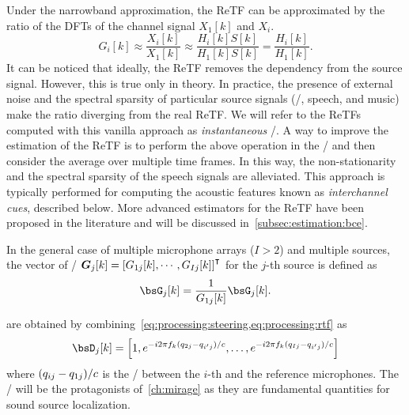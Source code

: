 \mynewline
Under the narrowband approximation, the \ac{ReTF} can be approximated by the ratio of the \acp{DFT} of the channel signal $X_1[k]$ and $X_i$.
\begin{equation}\label{eq:processing:inst_retf}
    G_i[k] \approx \frac{X_i[k]}{X_1[k]} \approx \frac{H_i[k]S[k]}{H_1[k]S[k]} = \frac{H_i[k]}{H_1[k]}
    .
\end{equation}
It can be noticed that ideally, the \ac{ReTF} removes the dependency from the source signal.
However, this is true only in theory.
In practice, the presence of external noise and the spectral sparsity of particular source signals (\eg/, speech, and music) make the ratio diverging from the real \ac{ReTF}.
We will refer to the \acp{ReTF} computed with this vanilla approach as \textit{instantaneous} \ReTF/.
A way to improve the estimation of the \ac{ReTF} is to perform the above operation in the \STFT/ and then consider the average over multiple time frames.
In this way, the non-stationarity and the spectral sparsity of the speech signals are alleviated.
This approach is typically performed for computing the acoustic features known as \textit{interchannel cues}, described below.
More advanced estimators for the \ac{ReTF} have been proposed in the literature and will be discussed in~\cref{subsec:estimation:bce}.


\mynewline
In the general case of multiple microphone arrays ($I>2$) and multiple sources, the vector of \ReTFs/
$\boldsymbol{G}_j[k] = \ktranspose{\klist{{G}_ {1j}[k], \cdots, {G}_{Ij}[k]}}$
for the $j$-th source is defined as
\begin{equation}
    {\bsG}_j[k] = \frac{1}{{G}_{1j}[k]} {\bsG}_j[k]
    .
\end{equation}

 are obtained by combining~\cref{eq:processing:steering,eq:processing:rtf} as
\begin{equation}\label{eq:processing:relativesteering}
    {\bsD}_{j}[k] = \klist{
                         1,
                         \cste^{-\csti 2 \pi f_k (\distMicSrc_{2j}-\distMicSrc_{i'j}) / \speedOfSound},
                         \ldots,
                         \cste^{-\csti 2 \pi f_k (\distMicSrc_{Ij}-\distMicSrc_{i'j}) / \speedOfSound}
                    }
\end{equation}
where $(q_{ij}-q_{1j}) / c$ is the \TDOA/ between the $i$-th and the reference microphones.
The \TDOAs/ will be the protagonists of~\cref{ch:mirage} as they are fundamental quantities for sound source localization.

